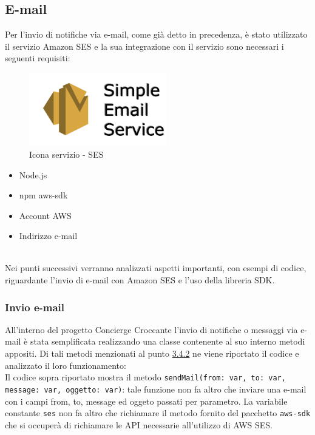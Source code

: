 \newpage
\subsection{E-mail}
Per l'invio di notifiche via e-mail, come già detto in precedenza, è stato utilizzato il servizio Amazon SES e la sua integrazione con il servizio sono necessari i seguenti requisiti:
\\
\begin{minipage}{0.47\textwidth}
	\begin{figure}[H]
		\includegraphics[width=6cm]{immagini/ses.png}
		\caption{\label{fig:google_calendar}Icona servizio - SES}
	\end{figure}
\end{minipage}
\begin{minipage}{0.5\textwidth}
	\begin{itemize}
		\item Node.js
		\item npm aws-sdk
		\item Account AWS
		\item Indirizzo e-mail
	\end{itemize}
\end{minipage}
\\[0.4cm]
Nei punti successivi verranno analizzati aspetti importanti, con esempi di codice, riguardante l'invio di e-mail con Amazon SES e l'uso della libreria SDK.

\subsubsection{Invio e-mail}
All'interno del progetto Concierge Croccante l'invio di notifiche o messaggi via e-mail è stata semplificata realizzando una classe contenente al suo interno metodi appositi. Di tali metodi menzionati al punto \hyperref[utils]{3.4.2} ne viene riportato il codice e analizzato il loro funzionamento: 
\\[0.1cm]

Il codice sopra riportato mostra il metodo \texttt{sendMail(from:  var, to:  var, message:  var, oggetto:  var)}: tale funzione non fa altro che inviare una e-mail con i campi from, to, message ed oggeto passati per parametro. La variabile constante \texttt{ses} non fa altro che richiamare il metodo fornito del pacchetto \texttt{aws-sdk} che si occuperà di richiamare le API necessarie all'utilizzo di AWS SES.

